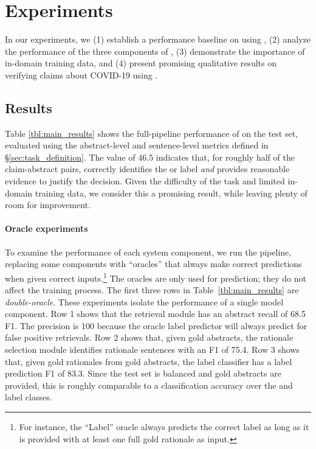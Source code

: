 \section{Experiments}

In our experiments, we (1) establish a performance baseline on \ours using \sysname, (2) analyze the performance of the three components of \sysname, (3) demonstrate the importance of in-domain training data, and (4) present promising qualitative results on verifying claims about COVID-19 using \sysname.

\subsection{Results}

Table \ref{tbl:main_results} shows the full-pipeline performance of \sysname on the \ours test set, evaluated using the abstract-level and sentence-level metrics defined in \S\ref{sec:task_definition}. The \fonecoarse value of 46.5 indicates that, for roughly half of the claim-abstract pairs, \sysname correctly identifies the \supports or  label \emph{and} provides reasonable evidence to justify the decision. Given the difficulty of the task and limited in-domain training data, we consider this a promising result, while leaving plenty of room for improvement.



\paragraph{Oracle experiments} To examine the performance of each system component, we run the \sysname pipeline, replacing some components with ``oracles'' that always make correct predictions when given correct inputs.\footnote{For instance, the ``Label'' oracle always predicts the correct label as long as it is provided with at least one full gold rationale as input.} The oracles are only used for prediction; they do not affect the training process. The first three rows in Table~\ref{tbl:main_results} are \emph{double-oracle}. These experiments isolate the performance of a single model component. Row 1 shows that the retrieval module has an abstract recall of 68.5 F1. The precision is 100 because the oracle label predictor will always predict \notenough for false positive retrievals. Row 2 shows that, given gold abstracts, the rationale selection module identifies rationale sentences with an F1 of 75.4. Row 3 shows that, given gold rationales from gold abstracts, the label classifier has a label prediction F1 of 83.3. Since the test set is balanced and gold abstracts are provided, this is roughly comparable to a classification accuracy over the \supports and  label classes.


